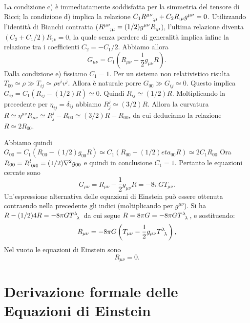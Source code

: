 La condizione c) è immediatamente soddisfatta per la simmetria del tensore di
Ricci; la condizione d) implica la relazione $C_1 \tensor{R}{^{\mu \nu}_{;\mu}}
+ C_2 R_{;\mu} g^{\mu \nu} = 0$.  Utilizzando l'identità di Bianchi contratta
($\tensor{R}{^{\mu \nu}_{; \mu}} = (1/2) g^{\mu \nu} R_{; \mu}$), l'ultima
relazione diventa $(C_2 + C_1/2) R_{; \nu} =0$, la quale senza perdere di
generalità implica infine la relazione tra i coefficienti $C_2 = -C_1/2$.
Abbiamo allora
\begin{equation}
  G_{\mu \nu} = C_1 \left(R_{\mu \nu} - \frac{1}{2} g_{\mu \nu} R \right).
\end{equation}
Dalla condizione e) fissiamo $C_1=1$.  Per un sistema non relativistico risulta
$T_{00} \simeq \rho \gg T_{ij} \simeq \rho v^i v^j$. Allora è naturale porre
$G_{00} \gg G_{ij} \simeq 0$.  Questo implica $G_{ij} = C_1 (R_{ij} -(1/2) R)
\simeq 0$.  Quindi $R_{ij} \simeq (1/2) R$.  Moltiplicando la precedente per
$\eta_{ij}=\delta_{ij}$ abbiamo $R^j_j \simeq (3/2) R$.  Allora la curvatura $R
\simeq \eta^{\mu \nu} R_{\mu \nu} \simeq R^j_j - R_{00} \simeq (3/2)R-R_{00}$,
da cui deduciamo la relazione $R \simeq 2 R_{00}$.

Abbiamo quindi $G_{00} = C_1 (R_{00}-(1/2) g_{00} R) \simeq C_1 (R_{00}-(1/2)
eta_{00} R) \simeq 2 C_1 R_{00}$ Ora $R_{00} = \tensor{R}{^{l}_{0l0}} = (1/2)
\nabla^2 g_{00}$ e quindi in conclusione $C_1=1$.  Pertanto le equazioni cercate
sono
\begin{equation}
  G_{\mu \nu} = R_{\mu \nu} - \frac{1}{2} g_{\mu \nu} R = -8 \pi G T_{\mu\nu}.
\end{equation}
Un'espressione alternativa delle equazioni di Einstein può essere ottenuta
contraendo nella precedente gli indici (moltiplicando per $g^{\mu \nu}$).  Si ha
$R-(1/2) 4 R = -8 \pi G \tensor{T}{^{\lambda}_{\lambda}}$ da cui segue $R= 8 \pi
G = -8 \pi G \tensor{T}{^{\lambda}_{\lambda}}$, e sostituendo:
\begin{equation}
  R_{\mu \nu}= -8 \pi G \left( T_{\mu \nu} - \frac{1}{2} g_{\mu \nu}
    \tensor{T}{^{\lambda}_{\lambda}} \right),
\end{equation}
Nel vuoto le equazioni di Einstein sono
\begin{equation}
  R_{\mu \nu}=0.
\end{equation}

\section{Derivazione formale delle Equazioni di Einstein}
\label{sec:equazioni-einstein}

